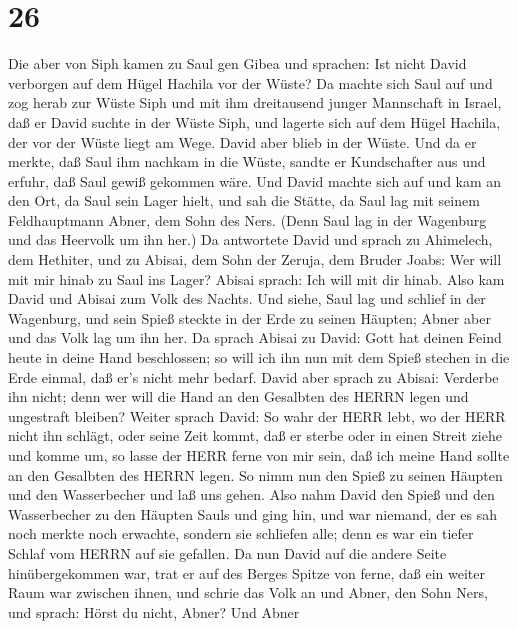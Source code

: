 \hypertarget{section-25}{%
\section{26}\label{section-25}}

 Die aber von Siph kamen zu Saul gen Gibea und sprachen: Ist
nicht David verborgen auf dem Hügel Hachila vor der Wüste? 
Da machte sich Saul auf und zog herab zur Wüste Siph und mit ihm
dreitausend junger Mannschaft in Israel, daß er David suchte in der
Wüste Siph,  und lagerte sich auf dem Hügel Hachila, der vor
der Wüste liegt am Wege. David aber blieb in der Wüste. Und da er
merkte, daß Saul ihm nachkam in die Wüste,  sandte er
Kundschafter aus und erfuhr, daß Saul gewiß gekommen wäre. 
Und David machte sich auf und kam an den Ort, da Saul sein Lager hielt,
und sah die Stätte, da Saul lag mit seinem Feldhauptmann Abner, dem Sohn
des Ners. (Denn Saul lag in der Wagenburg und das Heervolk um ihn her.)
 Da antwortete David und sprach zu Ahimelech, dem Hethiter,
und zu Abisai, dem Sohn der Zeruja, dem Bruder Joabs: Wer will mit mir
hinab zu Saul ins Lager? Abisai sprach: Ich will mit dir hinab.
 Also kam David und Abisai zum Volk des Nachts. Und siehe,
Saul lag und schlief in der Wagenburg, und sein Spieß steckte in der
Erde zu seinen Häupten; Abner aber und das Volk lag um ihn her.
 Da sprach Abisai zu David: Gott hat deinen Feind heute in
deine Hand beschlossen; so will ich ihn nun mit dem Spieß stechen in die
Erde einmal, daß er's nicht mehr bedarf.  David aber sprach
zu Abisai: Verderbe ihn nicht; denn wer will die Hand an den Gesalbten
des HERRN legen und ungestraft bleiben?  Weiter sprach
David: So wahr der HERR lebt, wo der HERR nicht ihn schlägt, oder seine
Zeit kommt, daß er sterbe oder in einen Streit ziehe und komme um,
 so lasse der HERR ferne von mir sein, daß ich meine Hand
sollte an den Gesalbten des HERRN legen. So nimm nun den Spieß zu seinen
Häupten und den Wasserbecher und laß uns gehen.  Also nahm
David den Spieß und den Wasserbecher zu den Häupten Sauls und ging hin,
und war niemand, der es sah noch merkte noch erwachte, sondern sie
schliefen alle; denn es war ein tiefer Schlaf vom HERRN auf sie
gefallen.  Da nun David auf die andere Seite
hinübergekommen war, trat er auf des Berges Spitze von ferne, daß ein
weiter Raum war zwischen ihnen,  und schrie das Volk an und
Abner, den Sohn Ners, und sprach: Hörst du nicht, Abner? Und Abner
